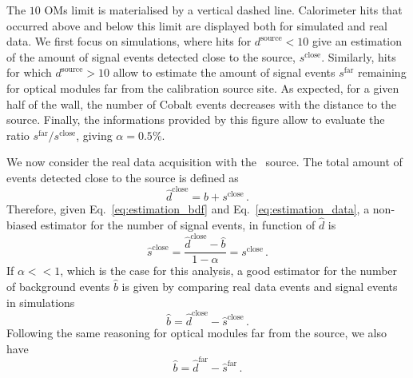 The $10$ OMs limit is materialised by a vertical dashed line.
Calorimeter hits that occurred above and below this limit are displayed both for simulated and real data.
We first focus on simulations, where hits for $d^{\text{source}}<10$ give an estimation of the amount of signal events detected close to the source, $s^{\text{close}}$.
Similarly, hits for which $d^{\text{source}}>10$ allow to estimate the amount of signal events $s^{\text{far}}$ remaining for optical modules far from the calibration source site.
As expected, for a given half of the wall, the number of Cobalt events decreases with the distance to the source.
Finally, the informations provided by this figure allow to evaluate the ratio $s^{\text{far}}/s^{\text{close}}$, giving $\alpha = 0.5\%$.

We now consider the real data acquisition with the \Co\ source.
The total amount of events detected close to the source is defined as
\begin{equation}
  \hat{d}^{\text{close}} = b + s^{\text{close}}\,.
  \label{eq:estimation_data}
\end{equation}
Therefore, given Eq.~\eqref{eq:estimation_bdf} and Eq.~\eqref{eq:estimation_data}, a non-biased estimator for the number of signal events, in function of $\hat{d}$ is
\begin{equation}
  \hat{s}^{\text{close}} = \frac{\hat{d}^{\text{close}}-\hat{b}}{1-\alpha} = s^{\text{close}}\,.
\end{equation}
If $\alpha << 1$, which is the case for this analysis, a good estimator for the number of background events $\hat{b}$ is given by comparing real data events and signal events in simulations
\begin{equation}
  \hat{b} = \hat{d}^{\text{close}} - \hat{s}^{\text{close}}\,.
  \label{eq:estimation_signal_close}
\end{equation}
Following the same reasoning for optical modules far from the source, we also have
\begin{equation}
  \hat{b} = \hat{d}^{\text{far}} - \hat{s}^{\text{far}}\,.
  \label{eq:estimation_signal_far}
\end{equation}


